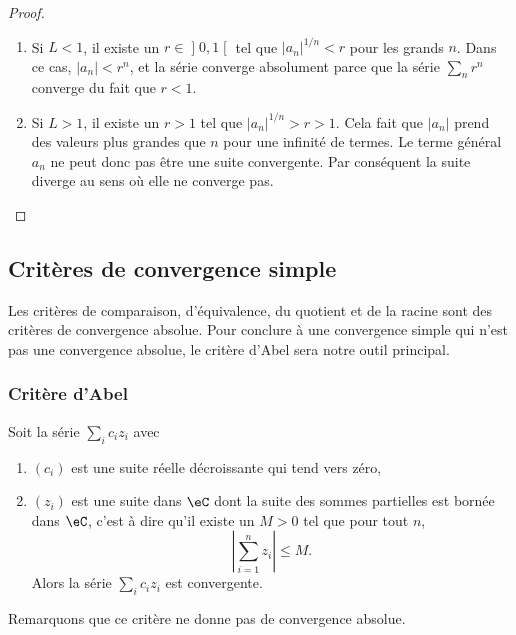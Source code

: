 \begin{proof}
    \begin{enumerate}
        \item
            Si $L<1$, il existe un $r\in \mathopen] 0 , 1 \mathclose[$ tel que $| a_n |^{1/n}<r$ pour les grands $n$. Dans ce cas, $| a_n |<r^{n}$, et la série converge absolument parce que la série $\sum_nr^n$ converge du fait que $r<1$.
        \item
            Si $L>1$, il existe un $r>1$ tel que $| a_n |^{1/n}>r>1$. Cela fait que $| a_n |$ prend des valeurs plus grandes que $n$ pour une infinité de termes. Le terme général $a_n$ ne peut donc pas être une suite convergente. Par conséquent la suite diverge au sens où elle ne converge pas.

    \end{enumerate}
\end{proof}

\subsection{Critères de convergence simple}

Les critères de comparaison, d'équivalence, du quotient et de la racine sont des critères de convergence absolue. Pour conclure à une convergence simple qui n'est pas une convergence absolue, le critère d'Abel sera notre outil principal.  

\subsubsection{Critère d'Abel}

\begin{proposition}
    Soit la série $\sum_i c_iz_i$ avec
    \begin{enumerate}
        \item $(c_i)$ est une suite réelle décroissante qui tend vers zéro,
        \item $(z_i)$ est une suite dans $\eC$ dont la suite des sommes partielles est bornée dans $\eC$, c'est à dire qu'il existe un $M>0$ tel que pour tout $n$,
        \begin{equation}
            \left| \sum_{i=1}^nz_i \right| \leq M.
        \end{equation}
        Alors la série $\sum_ic_iz_i$ est convergente.
    \end{enumerate}
\end{proposition}
Remarquons que ce critère ne donne pas de convergence absolue.

